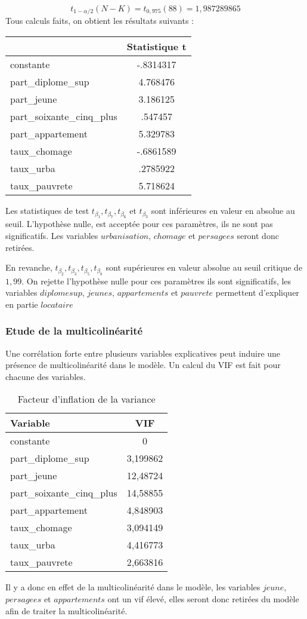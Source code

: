 \documentclass[]{article}
\begin{document}
\begin{equation*}
    t_{1-\alpha/2}(N-K) = t_{0,975}(88) = 1,987289865 
\end{equation*}
Tous calculs faits, on obtient les résultats suivants :
\begin{table}[H]
\centering
\begin{tabular}{l*{1}{c}}
\toprule
            &Statistique t\\
\midrule
constante      &   -.8314317\\
part\_diplome\_sup&    4.768476\\
part\_jeune  &    3.186125\\
part\_soixante\_cinq\_plus&     .547457\\
part\_appartement&    5.329783\\
taux\_chomage&   -.6861589\\
taux\_urba   &    .2785922\\
taux\_pauvrete&    5.718624\\
\bottomrule
\end{tabular}
\end{table}
Les statistiques de test $t_{\beta_1},t_{\beta_7},t_{\beta_6}$ et $t_{\beta_3}$ sont inférieures en valeur en absolue au seuil. L'hypothèse nulle, est
acceptée pour ces paramètres, ils ne sont pas significatifs. Les variables $urbanisation$, $chomage$ et $persagees$ seront donc retirées.

En revanche, $t_{\beta_2}, t_{\beta_3}, t_{\beta_5}, t_{\beta_8}$ sont supérieures en valeur absolue au seuil critique de $1,99$. On rejette l'hypothèse nulle pour ces paramètres
ils sont significatifs, les variables $diplomesup$, $jeunes$, $appartements$ et $pauvrete$ permettent d'expliquer en partie $locataire$
\subsubsection{Etude de la multicolinéarité}
Une corrélation forte entre plusieurs variables explicatives peut induire une présence de multicolinéarité dans le modèle. Un calcul du VIF est fait pour chacune des variables.
\begin{table}[H]
\centering
\caption{Facteur d'inflation de la variance}
\begin{tabular}{l*{1}{c}}
\toprule
Variable            &         VIF\\
\midrule
constante & 0 \\
part\_diplome\_sup&    3,199862\\
part\_jeune  &    12,48724\\
part\_soixante\_cinq\_plus&    14,58855\\
part\_appartement&    4,848903\\
taux\_chomage&    3,094149\\
taux\_urba   &    4,416773\\
taux\_pauvrete&    2,663816\\
\bottomrule
\end{tabular}
\end{table}
Il y a donc en effet de la multicolinéarité dans le modèle, les variables $jeune$, $persagees$ et $appartements$ ont un vif
élevé, elles seront donc retirées du modèle afin de traiter la multicolinéarité.
\end{document}
